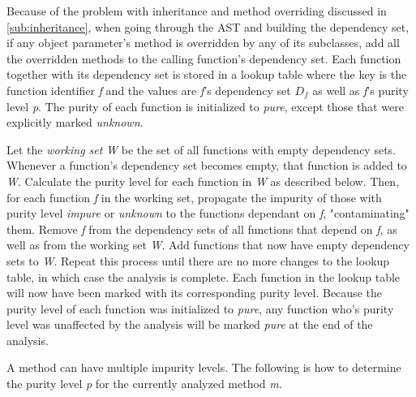 \documentclass[a4paper,12pt]{article}
\begin{document}
Because of the problem with inheritance and method overriding discussed in \autoref{sub:inheritance},
when going through the AST and building the dependency set, if any object parameter's method is overridden by any of its subclasses, add all the overridden methods to the calling function's dependency set.
Each function together with its dependency set is stored in a lookup table where the key is the function identifier \textit{f} and the values are \textit{f}'s dependency set $D_f$ as well as \textit{f}'s purity level \textit{p}. The purity of each function is initialized to \textit{pure}, except those that were explicitly marked \textit{unknown}.

Let the \textit{working set} \textit{W} be the set of all functions with empty dependency sets. Whenever a function's dependency set becomes empty, that function is added to \textit{W}. Calculate the purity level for each function in \textit{W} as described below. Then, for each function \textit{f} in the working set, propagate the impurity of those with purity level \textit{impure} or \textit{unknown} to the functions dependant on \textit{f}, "contaminating" them. Remove \textit{f} from the dependency sets of all functions that depend on \textit{f}, as well as from the working set \textit{W}. Add functions that now have empty dependency sets to \textit{W}. Repeat this process until there are no more changes to the lookup table, in which case the analysis is complete. Each function in the lookup table will now have been marked with its corresponding purity level. Because the purity level of each function was initialized to \textit{pure}, any function who's purity level was unaffected by the analysis will be marked \textit{pure} at the end of the analysis.

A method can have multiple impurity levels. The following is how to determine the purity level \textit{p} for the currently analyzed method \textit{m}.
\end{document}
